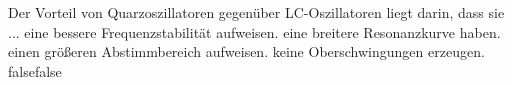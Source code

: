     {Der Vorteil von Quarzoszillatoren gegenüber LC-Oszillatoren liegt darin, dass sie ...}
    {eine bessere Frequenzstabilität aufweisen.}
    {eine breitere Resonanzkurve haben.}
    {einen größeren Abstimmbereich aufweisen.}
    {keine Oberschwingungen erzeugen.}
    {false}{false}